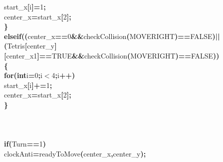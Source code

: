 \documentclass[a4paper, 10pt]{article}
\newcommand\SPC{\hspace*{0.6em}}
\newcommand\HYP{\mbox{\char 45}}
\newcommand{\CppAIdentifier}[1]{#1}
\newcommand{\CppANumber}[1]{\textcolor[rgb]{0.5,0,0.5}{#1}}
\newcommand{\CppAReservedWord}[1]{\textbf{#1}}
\newcommand{\CppASpace}[1]{\colorbox[rgb]{1,1,1}{#1}}
\newcommand{\CppASymbol}[1]{\textbf{\textcolor[rgb]{1,0,0}{#1}}}
\begin{document}
\begin{ttfamily}
\CppASpace{\SPC \SPC \SPC \SPC \SPC \SPC }\CppAIdentifier{start\_x}\CppASymbol{[}\CppAIdentifier{i}\CppASymbol{]}\CppASymbol{\HYP =}\CppANumber{1}\CppASymbol{;}\\
\CppASpace{\SPC \SPC \SPC \SPC \SPC }\CppAIdentifier{center\_x}\CppASymbol{=}\CppAIdentifier{start\_x}\CppASymbol{[}\CppANumber{2}\CppASymbol{]}\CppASymbol{;}\\
\CppASpace{\SPC \SPC \SPC \SPC }\CppASymbol{\}}\\
\CppASpace{\SPC \SPC \SPC \SPC }\CppAReservedWord{else}\CppASpace{\SPC }\CppAReservedWord{if}\CppASymbol{(}\CppASymbol{(}\CppAIdentifier{center\_x}\CppASymbol{==}\CppANumber{0}\CppASpace{\SPC }\CppASymbol{\&\&}\CppASpace{\SPC }\CppAIdentifier{checkCollision}\CppASymbol{(}\CppAIdentifier{MOVERIGHT}\CppASymbol{)}\CppASymbol{==}\CppAIdentifier{FALSE}\CppASymbol{)}\CppASpace{\SPC }\CppASymbol{||}\CppASpace{\SPC }\CppASymbol{(}\CppAIdentifier{Tetris}\CppASymbol{[}\CppAIdentifier{center\_y}\CppASymbol{]}\CppASymbol{[}\CppAIdentifier{center\_x}\CppASymbol{\HYP }\CppANumber{1}\CppASymbol{]}\CppASymbol{==}\CppAIdentifier{TRUE}\CppASymbol{\&\&}\CppAIdentifier{checkCollision}\CppASymbol{(}\CppAIdentifier{MOVERIGHT}\CppASymbol{)}\CppASymbol{==}\CppAIdentifier{FALSE}\CppASymbol{)}\CppASymbol{)}\\
\CppASpace{\SPC \SPC \SPC \SPC }\CppASymbol{\{}\\
\CppASpace{\SPC \SPC \SPC \SPC \SPC }\CppAReservedWord{for}\CppASymbol{(}\CppAReservedWord{int}\CppASpace{\SPC }\CppAIdentifier{i}\CppASymbol{=}\CppANumber{0}\CppASymbol{;}\CppAIdentifier{i}\CppASymbol{$<$}\CppANumber{4}\CppASymbol{;}\CppAIdentifier{i}\CppASymbol{++}\CppASymbol{)}\\
\CppASpace{\SPC \SPC \SPC \SPC \SPC \SPC }\CppAIdentifier{start\_x}\CppASymbol{[}\CppAIdentifier{i}\CppASymbol{]}\CppASymbol{+=}\CppANumber{1}\CppASymbol{;}\\
\CppASpace{\SPC \SPC \SPC \SPC \SPC }\CppAIdentifier{center\_x}\CppASymbol{=}\CppAIdentifier{start\_x}\CppASymbol{[}\CppANumber{2}\CppASymbol{]}\CppASymbol{;}\\
\CppASpace{\SPC \SPC \SPC \SPC }\CppASymbol{\}}\\
\\
\\
\\
\CppASpace{\SPC \SPC \SPC \SPC }\CppAReservedWord{if}\CppASymbol{(}\CppAIdentifier{Turn}\CppASymbol{==}\CppANumber{1}\CppASymbol{)}\\
\CppASpace{\SPC \SPC \SPC \SPC }\CppAIdentifier{clockAnti}\CppASymbol{=}\CppAIdentifier{readyToMove}\CppASymbol{(}\CppAIdentifier{center\_x}\CppASymbol{,}\CppAIdentifier{center\_y}\CppASymbol{)}\CppASymbol{;}\\

\end{ttfamily}
\end{document}
